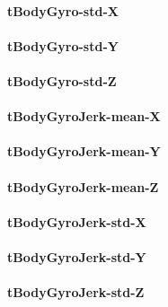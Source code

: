 \documentclass[
]{article}
\begin{document}
\hypertarget{tbodygyro-std-x}{%
\paragraph{tBodyGyro-std-X}\label{tbodygyro-std-x}}

\hypertarget{tbodygyro-std-y}{%
\paragraph{tBodyGyro-std-Y}\label{tbodygyro-std-y}}

\hypertarget{tbodygyro-std-z}{%
\paragraph{tBodyGyro-std-Z}\label{tbodygyro-std-z}}

\hypertarget{tbodygyrojerk-mean-x}{%
\paragraph{tBodyGyroJerk-mean-X}\label{tbodygyrojerk-mean-x}}

\hypertarget{tbodygyrojerk-mean-y}{%
\paragraph{tBodyGyroJerk-mean-Y}\label{tbodygyrojerk-mean-y}}

\hypertarget{tbodygyrojerk-mean-z}{%
\paragraph{tBodyGyroJerk-mean-Z}\label{tbodygyrojerk-mean-z}}

\hypertarget{tbodygyrojerk-std-x}{%
\paragraph{tBodyGyroJerk-std-X}\label{tbodygyrojerk-std-x}}

\hypertarget{tbodygyrojerk-std-y}{%
\paragraph{tBodyGyroJerk-std-Y}\label{tbodygyrojerk-std-y}}

\hypertarget{tbodygyrojerk-std-z}{%
\paragraph{tBodyGyroJerk-std-Z}\label{tbodygyrojerk-std-z}}
\end{document}
